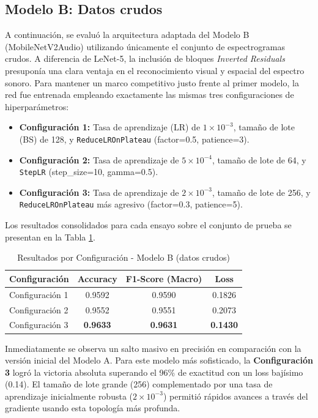 \documentclass[conference]{IEEEtran}
\begin{document}
\subsection{Modelo B: Datos crudos}

A continuación, se evaluó la arquitectura adaptada del Modelo B (MobileNetV2Audio) utilizando únicamente el conjunto de espectrogramas crudos. A diferencia de LeNet-5, la inclusión de bloques \textit{Inverted Residuals} presuponía una clara ventaja en el reconocimiento visual y espacial del espectro sonoro. Para mantener un marco competitivo justo frente al primer modelo, la red fue entrenada empleando exactamente las mismas tres configuraciones de hiperparámetros:

\begin{itemize}
    \item \textbf{Configuración 1:} Tasa de aprendizaje (LR) de $1 \times 10^{-3}$, tamaño de lote (BS) de 128, y \texttt{ReduceLROnPlateau} (factor=0.5, patience=3).
    \item \textbf{Configuración 2:} Tasa de aprendizaje de $5 \times 10^{-4}$, tamaño de lote de 64, y \texttt{StepLR} (step\_size=10, gamma=0.5).
    \item \textbf{Configuración 3:} Tasa de aprendizaje de $2 \times 10^{-3}$, tamaño de lote de 256, y \texttt{ReduceLROnPlateau} más agresivo (factor=0.3, patience=5).
\end{itemize}

Los resultados consolidados para cada ensayo sobre el conjunto de prueba se presentan en la Tabla \ref{tab:metricas_b_configs_raw}.

\begin{table}[htbp]
\caption{Resultados por Configuración - Modelo B (datos crudos)}
\label{tab:metricas_b_configs_raw}
\centering
\begin{tabular}{lccc}
\toprule
\textbf{Configuración} & \textbf{Accuracy} & \textbf{F1-Score (Macro)} & \textbf{Loss} \\
\midrule
Configuración 1 & 0.9592 & 0.9590 & 0.1826 \\
Configuración 2 & 0.9552 & 0.9551 & 0.2073 \\
Configuración 3 & \textbf{0.9633} & \textbf{0.9631} & \textbf{0.1430} \\
\bottomrule
\end{tabular}
\end{table}

Inmediatamente se observa un salto masivo en precisión en comparación con la versión inicial del Modelo A. Para este modelo más sofisticado, la \textbf{Configuración 3} logró la victoria absoluta superando el 96\% de exactitud con un loss bajísimo (0.14). El tamaño de lote grande (256) complementado por una tasa de aprendizaje inicialmente robusta ($2 \times 10^{-3}$) permitió rápidos avances a través del gradiente usando esta topología más profunda.
\end{document}
